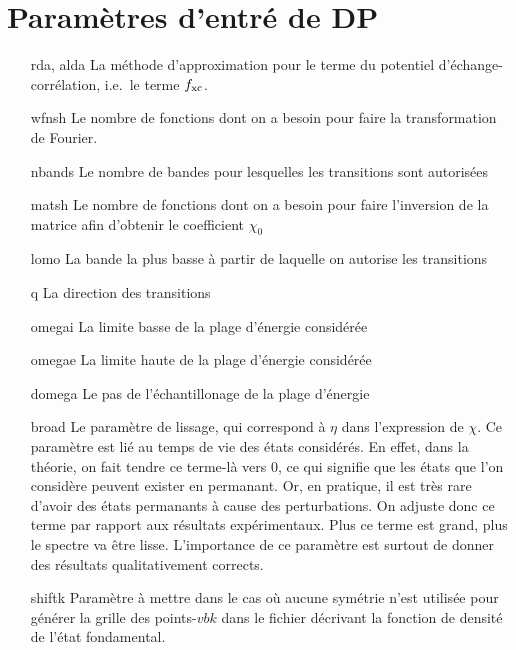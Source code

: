 \section{Paramètres d'entré de DP}
\begin{itemize}[labelwidth=, leftmargin=+, font=\bfseries]
  \item[rda, alda] La méthode d'approximation pour le terme du potentiel d'échange-corrélation, i.e.\ le terme $f_{\textnormal{xc}}$. %
  \item[wfnsh] Le nombre de fonctions dont on a besoin pour faire la transformation de Fourier.
  \item[nbands] Le nombre de bandes pour lesquelles les transitions sont autorisées
  \item[matsh] Le nombre de fonctions dont on a besoin pour faire l'inversion de la matrice afin d'obtenir le coefficient $\chi_0$
  \item[lomo] La bande la plus basse à partir de laquelle on autorise les transitions
  \item[q] La direction des transitions
  \item[omegai] La limite basse de la plage d'énergie considérée
  \item[omegae] La limite haute de la plage d'énergie considérée
  \item[domega] Le pas de l'échantillonage de la plage d'énergie
  \item[broad] Le paramètre de lissage, qui correspond à $\eta$ dans l'expression de $\chi$.
    Ce paramètre est lié au temps de vie des états considérés.
    En effet, dans la théorie, on fait tendre ce terme-là vers 0,
    ce qui signifie que les états que l'on considère peuvent exister en permanant.
    Or, en pratique, il est très rare d'avoir des états permanants à cause des perturbations.
    On adjuste donc ce terme par rapport aux résultats expérimentaux.
    Plus ce terme est grand, plus le spectre va être lisse.
    L'importance de ce paramètre est surtout de donner des résultats qualitativement corrects.
  \item[shiftk] Paramètre à mettre dans le cas où aucune symétrie n'est utilisée pour générer
    la grille des points-$vb{k}$ dans le fichier décrivant la fonction de densité de l'état fondamental.
\end{itemize}
